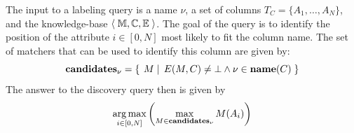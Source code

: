 The input to a labeling query is a name $\nu$, a set of columns $T_C = \{A_1, \ldots, A_N\}$, and the knowledge-base $\left<\;{\mathbb M, \mathbb C, \mathbb E}\;\right>$. 
The goal of the query is to identify the position of the attribute $i \in [0,N]$ most likely to fit the column name.
The set of matchers that can be used to identify this column are given by:
$$\textbf{candidates}_\nu = \left\{\left.\;{M}\;\right|\;{E(M, C) \neq \bot \wedge \nu \in \textbf{name}(C)}\;\right\}$$
The answer to the discovery query then is given by
$$\operatorname*{arg\,max}_{i \in [0,N]} \left( \max_{M \in \textbf{candidates}_\nu} M(A_i)\right)$$
